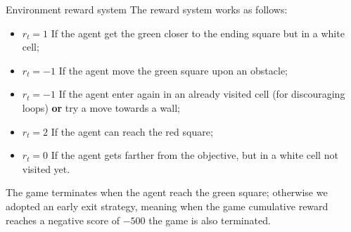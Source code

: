 \documentclass{beamer}
\begin{document}
\begin{frame}{Environment reward system}
	The reward system works as follows:
	\begin{itemize}
		\item $r_t = 1$ If the agent get the green closer to the ending square but in a white cell;
		\item $r_t = -1$ If the agent move the green square upon an obstacle;
		\item $r_t = -1$ If the agent enter again in an already visited cell (for discouraging loops) \textbf{or} try a move towards a wall;
		\item $r_t = 2$ If the agent can reach the red square;
		\item $r_t = 0$ If the agent gets farther from the objective, but in a white cell not visited yet.
	\end{itemize}
	The game terminates when the agent reach the green square; otherwise we adopted an early exit strategy, meaning when the game cumulative reward reaches a negative score of $-500$ the game is also terminated. 
\end{frame}
\end{document}
